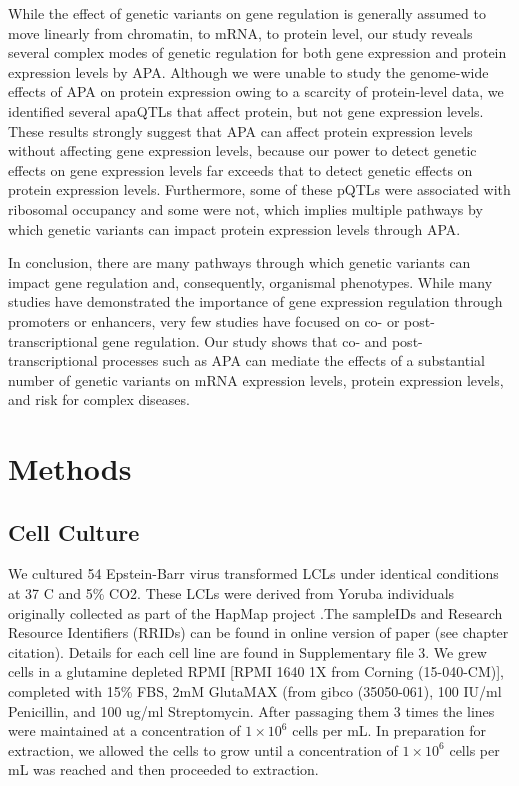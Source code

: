 While the effect of genetic variants on gene regulation is generally assumed to move linearly from chromatin, to mRNA, to protein level, our study reveals several complex modes of genetic regulation for both gene expression and protein expression levels by APA. Although we were unable to study the genome-wide effects of APA on protein expression owing to a scarcity of protein-level data, we identified several apaQTLs that affect protein, but not gene expression levels. These results strongly suggest that APA can affect protein expression levels without affecting gene expression levels, because our power to detect genetic effects on gene expression levels far exceeds that to detect genetic effects on protein expression levels. Furthermore, some of these pQTLs were associated with ribosomal occupancy and some were not, which implies multiple pathways by which genetic variants can impact protein expression levels through APA.

In conclusion, there are many pathways through which genetic variants can impact gene regulation and, consequently, organismal phenotypes. While many studies have demonstrated the importance of gene expression regulation through promoters or enhancers, very few studies have focused on co- or post-transcriptional gene regulation. Our study shows that co- and post-transcriptional processes such as APA can mediate the effects of a substantial number of genetic variants on mRNA expression levels, protein expression levels, and risk for complex diseases.


\section{Methods}\label{ch02-methods}

\subsection{Cell Culture}\label{ch02-cell-culture}

We cultured 54 Epstein-Barr virus transformed LCLs under identical conditions at 37 C and 5\% CO2. These LCLs were derived from Yoruba individuals originally collected as part of the HapMap project \cite{international_hapmap_consortium_haplotype_2005}.The sampleIDs and Research Resource Identifiers (RRIDs) can be found in online version of paper (see chapter citation). Details for each cell line are found in Supplementary file 3. We grew cells in a glutamine depleted RPMI [RPMI 1640 1X from Corning (15-040-CM)], completed with 15\% FBS, 2mM GlutaMAX (from gibco (35050-061), 100 IU/ml Penicillin, and 100 ug/ml Streptomycin. After passaging them 3 times the lines were maintained at a concentration of $1\times10^{6}$ cells per mL. In preparation for extraction, we allowed the cells to grow until a concentration of $1\times10^{6}$ cells per mL was reached and then proceeded to extraction. \

